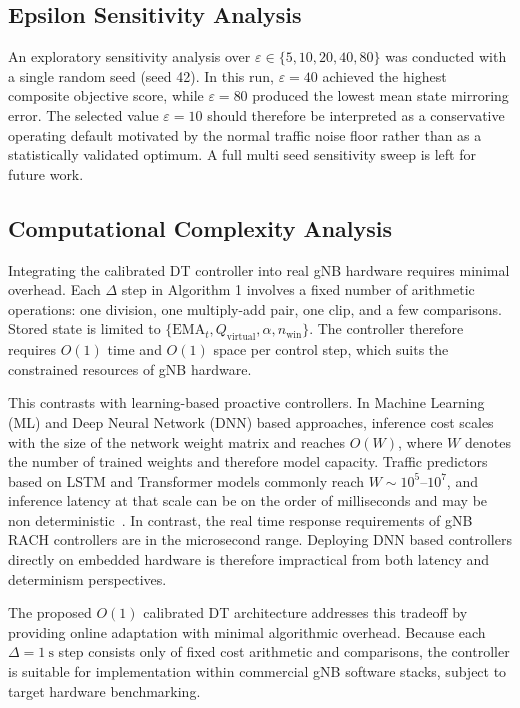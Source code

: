 \documentclass[conference]{IEEEtran}
\newcommand{\qvirt}{Q_{\mathrm{virtual}}}
\newcommand{\ema}{\mathrm{EMA}}
\begin{document}
\subsection{Epsilon Sensitivity Analysis}

An exploratory sensitivity analysis over $\varepsilon \in \{5, 10, 20, 40, 80\}$ was conducted with a single random seed (seed 42). In this run, $\varepsilon = 40$ achieved the highest composite objective score, while $\varepsilon = 80$ produced the lowest mean state mirroring error. The selected value $\varepsilon = 10$ should therefore be interpreted as a conservative operating default motivated by the normal traffic noise floor rather than as a statistically validated optimum. A full multi seed sensitivity sweep is left for future work.

\subsection{Computational Complexity Analysis}

Integrating the calibrated DT controller into real gNB hardware requires minimal overhead. Each $\Delta$ step in Algorithm 1 involves a fixed number of arithmetic operations: one division, one multiply-add pair, one clip, and a few comparisons. Stored state is limited to $\{\ema_t, \qvirt, \alpha, n_{\mathrm{win}}\}$. The controller therefore requires $O(1)$ time and $O(1)$ space per control step, which suits the constrained resources of gNB hardware.

This contrasts with learning-based proactive controllers. In Machine Learning (ML) and Deep Neural Network (DNN) based approaches, inference cost scales with the size of the network weight matrix and reaches $O(W)$, where $W$ denotes the number of trained weights and therefore model capacity. Traffic predictors based on LSTM and Transformer models commonly reach $W \sim 10^5$--$10^7$, and inference latency at that scale can be on the order of milliseconds and may be non deterministic~\cite{b9}. In contrast, the real time response requirements of gNB RACH controllers are in the microsecond range. Deploying DNN based controllers directly on embedded hardware is therefore impractical from both latency and determinism perspectives.

The proposed $O(1)$ calibrated DT architecture addresses this tradeoff by providing online adaptation with minimal algorithmic overhead. Because each $\Delta = 1\ \mathrm{s}$ step consists only of fixed cost arithmetic and comparisons, the controller is suitable for implementation within commercial gNB software stacks, subject to target hardware benchmarking.
\end{document}
